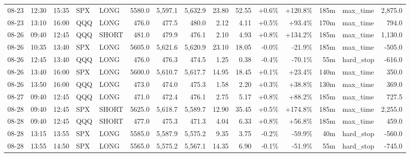 \documentclass[11pt,a4paper,twoside]{article}
\begin{document}
\begin{landscape}
\begin{center}
\begin{longtable}{>{\color{txtmain}}l l l l l r r r r r r r r >{\color{txtmain}}l r}
08-23 & 12:30 & 15:35 & SPX & LONG & 5580.0 & 5,597.1 & 5,632.9 & 23.80 & 52.55 & \textcolor{wingreen}{+0.6\%} & \textcolor{wingreen}{+120.8\%} & 185m & max\_time & \textcolor{wingreen}{2,875.0} \\
08-23 & 13:10 & 16:00 & QQQ & LONG & 476.0 & 477.5 & 480.0 & 2.12 & 4.11 & \textcolor{wingreen}{+0.5\%} & \textcolor{wingreen}{+93.4\%} & 170m & max\_time & \textcolor{wingreen}{794.0} \\
08-26 & 09:40 & 12:45 & QQQ & SHORT & 481.0 & 479.9 & 476.1 & 2.10 & 4.93 & \textcolor{wingreen}{+0.8\%} & \textcolor{wingreen}{+134.2\%} & 185m & max\_time & \textcolor{wingreen}{1,130.0} \\
08-26 & 10:35 & 13:40 & SPX & LONG & 5605.0 & 5,621.6 & 5,620.9 & 23.10 & 18.05 & \textcolor{lossred}{-0.0\%} & \textcolor{lossred}{-21.9\%} & 185m & max\_time & \textcolor{lossred}{-505.0} \\
08-26 & 12:45 & 13:40 & QQQ & LONG & 476.0 & 476.3 & 474.5 & 1.25 & 0.38 & \textcolor{lossred}{-0.4\%} & \textcolor{lossred}{-70.1\%} & 55m & hard\_stop & \textcolor{lossred}{-616.0} \\
08-26 & 13:40 & 16:00 & SPX & LONG & 5600.0 & 5,610.7 & 5,617.7 & 14.95 & 18.45 & \textcolor{wingreen}{+0.1\%} & \textcolor{wingreen}{+23.4\%} & 140m & max\_time & \textcolor{wingreen}{350.0} \\
08-26 & 13:50 & 16:00 & QQQ & LONG & 473.0 & 474.0 & 475.3 & 1.58 & 2.20 & \textcolor{wingreen}{+0.3\%} & \textcolor{wingreen}{+38.8\%} & 130m & max\_time & \textcolor{wingreen}{369.0} \\
08-27 & 09:40 & 12:45 & QQQ & LONG & 471.0 & 472.4 & 476.1 & 2.75 & 5.17 & \textcolor{wingreen}{+0.8\%} & \textcolor{wingreen}{+88.2\%} & 185m & max\_time & \textcolor{wingreen}{727.5} \\
08-28 & 09:40 & 12:45 & SPX & SHORT & 5625.0 & 5,618.7 & 5,589.7 & 12.90 & 35.45 & \textcolor{wingreen}{+0.5\%} & \textcolor{wingreen}{+174.8\%} & 185m & max\_time & \textcolor{wingreen}{2,255.0} \\
08-28 & 09:40 & 12:45 & QQQ & SHORT & 477.0 & 475.3 & 471.3 & 4.04 & 6.33 & \textcolor{wingreen}{+0.8\%} & \textcolor{wingreen}{+56.8\%} & 185m & max\_time & \textcolor{wingreen}{459.0} \\
08-28 & 13:15 & 13:55 & SPX & LONG & 5585.0 & 5,587.9 & 5,575.2 & 9.35 & 3.75 & \textcolor{lossred}{-0.2\%} & \textcolor{lossred}{-59.9\%} & 40m & hard\_stop & \textcolor{lossred}{-560.0} \\
08-28 & 13:55 & 14:50 & SPX & LONG & 5565.0 & 5,575.2 & 5,567.1 & 14.35 & 6.90 & \textcolor{lossred}{-0.1\%} & \textcolor{lossred}{-51.9\%} & 55m & hard\_stop & \textcolor{lossred}{-745.0} \\

\end{longtable}
\end{center}
\end{landscape}
\end{document}
